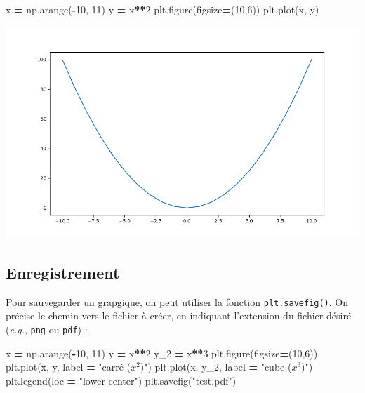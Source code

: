 \documentclass[12pt,]{book}
\newenvironment{Shaded}{\begin{snugshade}}{\end{snugshade}}
\newcommand{\DecValTok}[1]{\textcolor[rgb]{0.00,0.00,0.81}{#1}}
\newcommand{\StringTok}[1]{\textcolor[rgb]{0.31,0.60,0.02}{#1}}
\newcommand{\OperatorTok}[1]{\textcolor[rgb]{0.81,0.36,0.00}{\textbf{#1}}}
\newcommand{\NormalTok}[1]{#1}
\numberwithin{equation}{section}
\numberwithin{countremarque}{section}
\begin{document}
\begin{Shaded}
\begin{Highlighting}[]
\NormalTok{x }\OperatorTok{=}\NormalTok{ np.arange(}\OperatorTok{-}\DecValTok{10}\NormalTok{, }\DecValTok{11}\NormalTok{)}
\NormalTok{y }\OperatorTok{=}\NormalTok{ x}\OperatorTok{**}\DecValTok{2}
\NormalTok{plt.figure(figsize}\OperatorTok{=}\NormalTok{(}\DecValTok{10}\NormalTok{,}\DecValTok{6}\NormalTok{))}
\NormalTok{plt.plot(x, y)}
\end{Highlighting}
\end{Shaded}

\begin{center}\includegraphics[width=13.89in]{figs/pyplot/plot_size} \end{center}

\subsection{Enregistrement}\label{enregistrement}

Pour sauvegarder un grapgique, on peut utiliser la fonction
\texttt{plt.savefig()}. On précise le chemin vers le fichier à créer, en
indiquant l'extension du fichier désiré (\emph{e.g.}, \texttt{png} ou
\texttt{pdf}) :

\begin{Shaded}
\begin{Highlighting}[]
\NormalTok{x }\OperatorTok{=}\NormalTok{ np.arange(}\OperatorTok{-}\DecValTok{10}\NormalTok{, }\DecValTok{11}\NormalTok{)}
\NormalTok{y }\OperatorTok{=}\NormalTok{ x}\OperatorTok{**}\DecValTok{2}
\NormalTok{y_2 }\OperatorTok{=}\NormalTok{ x}\OperatorTok{**}\DecValTok{3}
\NormalTok{plt.figure(figsize}\OperatorTok{=}\NormalTok{(}\DecValTok{10}\NormalTok{,}\DecValTok{6}\NormalTok{))}
\NormalTok{plt.plot(x, y, label }\OperatorTok{=} \StringTok{"carré ($x^2$)"}\NormalTok{)}
\NormalTok{plt.plot(x, y_2, label }\OperatorTok{=} \StringTok{"cube ($x^3$)"}\NormalTok{)}
\NormalTok{plt.legend(loc }\OperatorTok{=} \StringTok{"lower center"}\NormalTok{)}
\NormalTok{plt.savefig(}\StringTok{"test.pdf"}\NormalTok{)}
\end{Highlighting}
\end{Shaded}
\end{document}
